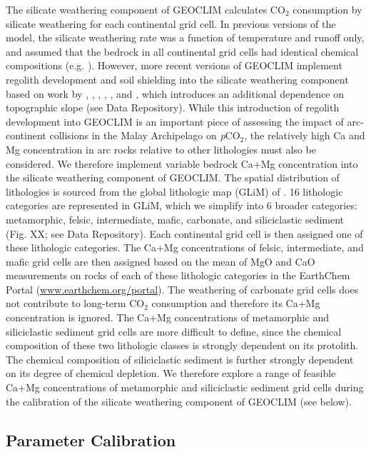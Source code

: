\documentclass[11pt,letterpaper]{article}
\newcommand{\pCOtwo}{\textit{p}CO$_{2}$\xspace}
\newcommand{\COtwo}{CO$_{2}$\xspace}
\begin{document}
The silicate weathering component of GEOCLIM calculates \COtwo consumption by silicate weathering for each continental grid cell. In previous versions of the model, the silicate weathering rate was a function of temperature and runoff only, and assumed that the bedrock in all continental grid cells had identical chemical compositions (e.g. \citealp{Godderis2014a}). However, more recent versions of GEOCLIM implement regolith development and soil shielding into the silicate weathering component based on work by \citet{Heimsath1997a}, \citet{Gabet2009a}, \citet{West2012a}, \citet{Carretier2014a}, \citet{Godderis2017b}, and \citet{Maffre2018a}, which introduces an additional dependence on topographic slope (see Data Repository). While this introduction of regolith development into GEOCLIM is an important piece of assessing the impact of arc-continent collisions in the Malay Archipelago on \pCOtwo, the relatively high Ca and Mg concentration in arc rocks relative to other lithologies must also be considered. We therefore implement variable bedrock Ca+Mg concentration into the silicate weathering component of GEOCLIM. The spatial distribution of lithologies is sourced from the global lithologic map (GLiM) of \citet{Hartmann2012a}. 16 lithologic categories are represented in GLiM, which we simplify into 6 broader categories: metamorphic, felsic, intermediate, mafic, carbonate, and siliciclastic sediment (Fig. XX; see Data Repository). Each continental grid cell is then assigned one of these lithologic categories. The Ca+Mg concentrations of felsic, intermediate, and mafic grid cells are then assigned based on the mean of MgO and CaO measurements on rocks of each of these lithologic categories in the EarthChem Portal (\url{www.earthchem.org/portal}). The weathering of carbonate grid cells does not contribute to long-term \COtwo consumption and therefore its Ca+Mg concentration is ignored. The Ca+Mg concentrations of metamorphic and siliciclastic sediment grid cells are more difficult to define, since the chemical composition of these two lithologic classes is strongly dependent on its protolith. The chemical composition of siliciclastic sediment is further strongly dependent on its degree of chemical depletion. We therefore explore a range of feasible Ca+Mg concentrations of metamorphic and siliciclastic sediment grid cells during the calibration of the silicate weathering component of GEOCLIM (see below).

\subsection*{Parameter Calibration}
\end{document}
